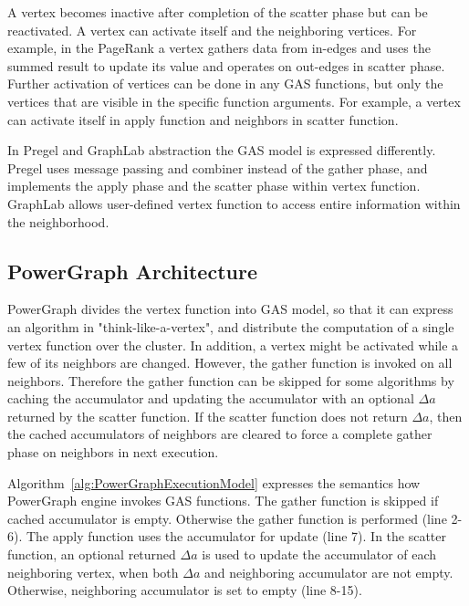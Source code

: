 

A vertex becomes inactive after completion of the scatter phase but can be reactivated. A vertex can activate itself and the neighboring vertices. For example, in the PageRank a vertex gathers data from in-edges and uses the summed result to update its value and operates on out-edges in scatter phase. Further activation of vertices can be done in any GAS functions, but only the vertices that are visible in the specific function arguments. For example, a vertex can activate itself in apply function and neighbors in scatter function.

In Pregel and GraphLab abstraction the GAS model is expressed differently. Pregel uses message passing and combiner instead of the gather phase, and implements the apply phase and the scatter phase within vertex function. GraphLab allows user-defined vertex function to access entire information within the neighborhood.

\subsection{PowerGraph Architecture}

PowerGraph divides the vertex function into GAS model, so that it can express an algorithm in "think-like-a-vertex", and distribute the computation of a single vertex function over the cluster. %
In addition, a vertex might be activated while a few of its neighbors are changed. However, the gather function is invoked on all neighbors. Therefore the gather function can be skipped for some algorithms by caching the accumulator and updating the accumulator with an optional $\Delta a$ returned by the scatter function. If the scatter function does not return $\Delta a$, then the cached accumulators of neighbors are cleared to force a complete gather phase on neighbors in next execution.

Algorithm~\vref{alg:PowerGraphExecutionModel} \cite{gonzalez2012powergraph} expresses the semantics how PowerGraph engine invokes GAS functions. The gather function is skipped if cached accumulator is empty. Otherwise the gather function is performed (line 2-6). The apply function uses the accumulator for update (line 7). In the scatter function, an optional returned $\Delta a$ is used to update the accumulator of each neighboring vertex, when both $\Delta a$ and neighboring accumulator are not empty. Otherwise, neighboring accumulator is set to empty (line 8-15).

